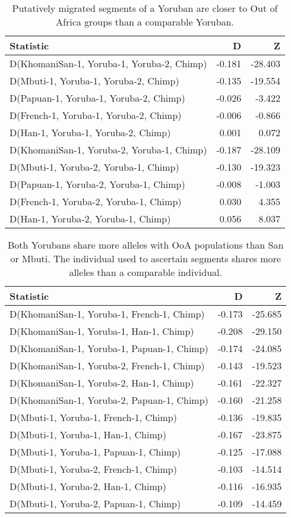 \begin{table}[ht]
\centering
\begin{tabular}{lrr}
  \hline
Statistic & D & Z \\ 
  \hline
D(KhomaniSan-1, Yoruba-1, Yoruba-2, Chimp) & -0.181 & -28.403 \\ 
  D(Mbuti-1, Yoruba-1, Yoruba-2, Chimp) & -0.135 & -19.554 \\ 
  D(Papuan-1, Yoruba-1, Yoruba-2, Chimp) & -0.026 & -3.422 \\ 
  D(French-1, Yoruba-1, Yoruba-2, Chimp) & -0.006 & -0.866 \\ 
  D(Han-1, Yoruba-1, Yoruba-2, Chimp) & 0.001 & 0.072 \\ 
  D(KhomaniSan-1, Yoruba-2, Yoruba-1, Chimp) & -0.187 & -28.109 \\ 
  D(Mbuti-1, Yoruba-2, Yoruba-1, Chimp) & -0.130 & -19.323 \\ 
  D(Papuan-1, Yoruba-2, Yoruba-1, Chimp) & -0.008 & -1.003 \\ 
  D(French-1, Yoruba-2, Yoruba-1, Chimp) & 0.030 & 4.355 \\ 
  D(Han-1, Yoruba-2, Yoruba-1, Chimp) & 0.056 & 8.037 \\ 
   \hline
\end{tabular}
\caption{Putatively migrated segments of a Yoruban are closer to Out of Africa groups than a comparable Yoruban.} 
\label{dstats:a1}
\end{table}
\begin{table}[ht]
\centering
\begin{tabular}{lrr}
  \hline
Statistic & D & Z \\ 
  \hline
D(KhomaniSan-1, Yoruba-1, French-1, Chimp) & -0.173 & -25.685 \\ 
  D(KhomaniSan-1, Yoruba-1, Han-1, Chimp) & -0.208 & -29.150 \\ 
  D(KhomaniSan-1, Yoruba-1, Papuan-1, Chimp) & -0.174 & -24.085 \\ 
  D(KhomaniSan-1, Yoruba-2, French-1, Chimp) & -0.143 & -19.523 \\ 
  D(KhomaniSan-1, Yoruba-2, Han-1, Chimp) & -0.161 & -22.327 \\ 
  D(KhomaniSan-1, Yoruba-2, Papuan-1, Chimp) & -0.160 & -21.258 \\ 
  D(Mbuti-1, Yoruba-1, French-1, Chimp) & -0.136 & -19.835 \\ 
  D(Mbuti-1, Yoruba-1, Han-1, Chimp) & -0.167 & -23.875 \\ 
  D(Mbuti-1, Yoruba-1, Papuan-1, Chimp) & -0.125 & -17.088 \\ 
  D(Mbuti-1, Yoruba-2, French-1, Chimp) & -0.103 & -14.514 \\ 
  D(Mbuti-1, Yoruba-2, Han-1, Chimp) & -0.116 & -16.935 \\ 
  D(Mbuti-1, Yoruba-2, Papuan-1, Chimp) & -0.109 & -14.459 \\ 
   \hline
\end{tabular}
\caption{Both Yorubans share more alleles with OoA populations than San or Mbuti. The individual used to ascertain segments shares more alleles than a comparable individual.} 
\label{dstats:a2}
\end{table}
